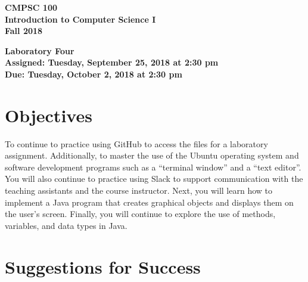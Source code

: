 \documentclass[11pt]{article}
\newcommand{\assignmentduedate}{October 2}
\newcommand{\assignmentassignedate}{September 25}
\newcommand{\assignmentnumber}{Four}
\newcommand{\labyear}{2018}
\newcommand{\labday}{Tuesday}
\newcommand{\labtime}{2:30 pm}
\newcommand{\assigneddate}{Assigned: \labday, \assignmentassignedate, \labyear{} at \labtime{}}
\newcommand{\duedate}{Due: \labday, \assignmentduedate, \labyear{} at \labtime{}}
\newcommand{\labtitle}[1]
{
  \begin{center}
    \begin{center}
      \bf
      CMPSC 100\\Introduction to Computer Science I\\
      Fall 2018\\
      \medskip
    \end{center}
    \bf
    #1
  \end{center}
}
\begin{document}
\thispagestyle{empty}

\labtitle{Laboratory \assignmentnumber{} \\ \assigneddate{} \\ \duedate{}}

\section*{Objectives}

To continue to practice using GitHub to access the files for a laboratory
assignment. Additionally, to master the use of the Ubuntu operating system and
software development programs such as a ``terminal window'' and a ``text
editor''. You will also continue to practice using Slack to support
communication with the teaching assistants and the course instructor. Next, you
will learn how to implement a Java program that creates graphical objects and
displays them on the user's screen. Finally, you will continue to explore the
use of methods, variables, and data types in Java.

\section*{Suggestions for Success}
\end{document}
